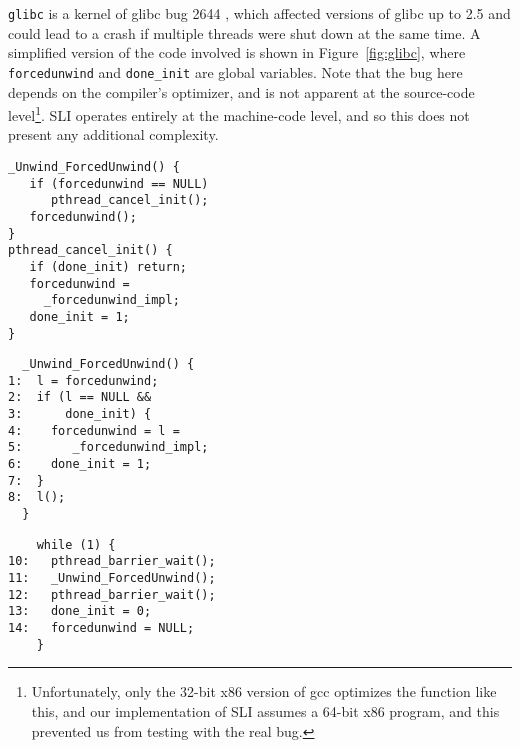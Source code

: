\verb|glibc| is a kernel of glibc bug 2644 \cite{glibc2644}, which
affected versions of glibc up to 2.5 and could lead to a crash if
multiple threads were shut down at the same time.  A simplified
version of the code involved is shown in Figure~\ref{fig:glibc}, where
\verb|forcedunwind| and \verb|done_init| are global variables.  Note
that the bug here depends on the compiler's optimizer, and is not
apparent at the source-code level\footnote{Unfortunately, only the
  32-bit x86 version of gcc optimizes the function like this, and our
  implementation of SLI assumes a 64-bit x86 program, and this
  prevented us from testing with the real bug.}.  SLI operates
entirely at the machine-code level, and so this does not present any
additional complexity.

\begin{figure*}
  \begin{subfloat}
    \begin{minipage}{52mm}
\begin{verbatim}
_Unwind_ForcedUnwind() {
   if (forcedunwind == NULL)
      pthread_cancel_init();
   forcedunwind();
}
pthread_cancel_init() {
   if (done_init) return;
   forcedunwind =
     _forcedunwind_impl;
   done_init = 1;
}
\end{verbatim}
    \end{minipage}
    \caption{Before optimizations}
  \end{subfloat}
  \begin{subfloat}
    \begin{minipage}{52mm}
\begin{verbatim}
  _Unwind_ForcedUnwind() {
1:  l = forcedunwind;
2:  if (l == NULL &&
3:      done_init) {
4:    forcedunwind = l =
5:       _forcedunwind_impl;
6:    done_init = 1;
7:  }
8:  l();
  }
\end{verbatim}
    \end{minipage}
    \caption{After optimizations}
  \end{subfloat}
  \begin{subfloat}
    \begin{minipage}{35mm}
\begin{verbatim}
    while (1) {
10:   pthread_barrier_wait();
11:   _Unwind_ForcedUnwind();
12:   pthread_barrier_wait();
13:   done_init = 0;
14:   forcedunwind = NULL;
    }
\end{verbatim}
    \end{minipage}
    \caption{Test harness}
  \end{subfloat}
  \label{fig:glibc}
  \caption{Source code for the glibc test case.}
\end{figure*}

